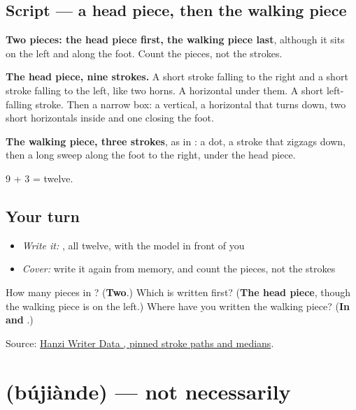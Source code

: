 \subsection*{Script — a head piece, then the walking piece}

\begin{quote}
\end{quote}

\textbf{Two pieces: the head piece first, the walking piece last}, although it sits on the left and along the foot. Count the pieces, not the strokes.

\textbf{The head piece, nine strokes.} A short stroke falling to the right and a short stroke falling to the left, like two horns. A horizontal under them. A short left-falling stroke. Then a narrow box: a vertical, a horizontal that turns down, two short horizontals inside and one closing the foot.

\textbf{The walking piece, three strokes}, as in : a dot, a stroke that zigzags down, then a long sweep along the foot to the right, under the head piece.

9 + 3 = twelve.

\subsection*{Your turn}
\begin{itemize}
\raggedright
  \item \emph{Write it:} , all twelve, with the model in front of you
  \item \emph{Cover:} write it again from memory, and count the pieces, not the strokes
\end{itemize}

\begin{tcolorbox}[breakable,colback=teal!4,colframe=teal!35!black,title={Before you move on}]
How many pieces in ? (\textbf{Two}.) Which is written first? (\textbf{The head piece}, though the walking piece is on the left.) Where have you written the walking piece? (\textbf{In  and }.)

Source: \href{https://raw.githubusercontent.com/chanind/hanzi-writer-data/68d10a4b21150cae5e1ebbd223eed289cf32d90c/data/\%E9\%81\%93.json}{Hanzi Writer Data , pinned stroke paths and medians}.
\end{tcolorbox}
\section[\texorpdfstring{\zh{不见得} (bújiànde)}{不见得 (bújiànde)}]{ (bújiànde) — not necessarily}

